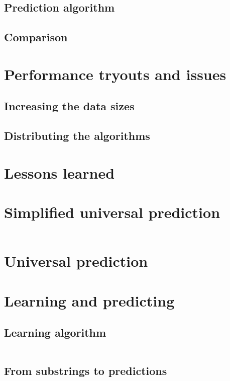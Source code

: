 \documentclass[a4paper,12pt]{article}
\begin{document}
  \subsection{Prediction algorithm}

  \subsection{Comparison}


\section{Performance tryouts and issues}

  \subsection{Increasing the data sizes}

  \subsection{Distributing the algorithms}

\section*{Lessons learned}

  \lipsum[8-9]

\clearpage
\begin{appendices}
  \section{Simplified universal prediction}

    \inputminted[linenos]{python}{code/simplified.py}

  \clearpage
  \section{Universal prediction}

    \lipsum[11-12]

  \clearpage
  \section{Learning and predicting}

    \subsection{Learning algorithm}

      \inputminted[linenos]{python}{code/learning.py}

    \clearpage
    \subsection{From substrings to predictions}

      \inputminted[linenos]{python}{code/predicting.py}

\end{appendices}
\end{document}
